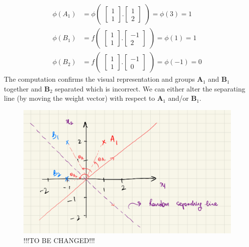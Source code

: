 \begin{align}
  \phi(A_1) &= \phi\begin{pmatrix}
    \begin{bmatrix}
      1\\
      1
    \end{bmatrix}.\begin{bmatrix}
      1 \\
      2
    \end{bmatrix}
  \end{pmatrix} = \phi(3) = 1 \\
  \phi(B_1) &= f\begin{pmatrix}
    \begin{bmatrix}
      1\\
      1
    \end{bmatrix}.\begin{bmatrix}
      -1 \\
      2
    \end{bmatrix}
  \end{pmatrix} = \phi(1) = 1 \\
  \phi(B_2) &= f\begin{pmatrix}
    \begin{bmatrix}
      1\\
      1
    \end{bmatrix}.\begin{bmatrix}
      -1 \\
      0
    \end{bmatrix}
  \end{pmatrix} = \phi(-1) = 0
\end{align}
The computation confirms the visual representation and groups $\textbf{A}_1$ and $\textbf{B}_1$ together and $\textbf{B}_2$ separated which is incorrect. We can either alter the separating line (by moving the weight vector) with respect to $\textbf{A}_1$ and/or $\textbf{B}_1$.
\begin{figure}[ht]
  \centering
  \includegraphics[scale=0.25]{CHAPTER_2/c2_fig_perceptron_example_3.jpeg}
  \caption{!!!TO BE CHANGED!!!}
  \label{fig:perceptron_example_3}
\end{figure}\\
